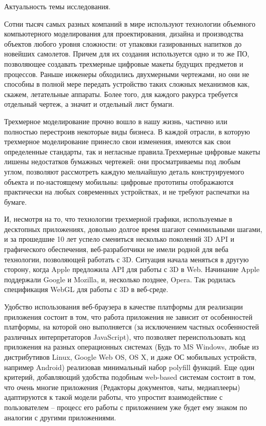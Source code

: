 \label{sec:intro}

Актуальность темы исследования. 

Сотни тысяч самых разных компаний в мире используют технологии объемного компьютерного моделирования для проектирования, дизайна и производства объектов любого уровня сложности: от упаковки 
газированных напитков до новейших самолетов. Причем для их создания используется одно и то же ПО, позволяющее создавать трехмерные цифровые макеты будущих предметов и процессов. 
Раньше инженеры обходились двухмерными чертежами, но они не способны в полной мере передать устройство таких сложных механизмов как, скажем, летательные аппараты. Более того, для 
каждого ракурса требуется отдельный чертеж, а значит и отдельный лист бумаги.

Трехмерное моделирование прочно вошло в нашу жизнь, частично или полностью перестроив некоторые виды бизнеса. В каждой отрасли, в которую трехмерное моделирование принесло свои изменения, имеются как свои
определенные стандарты, так и негласные правила.Трехмерные цифровые макеты лишены недостатков бумажных чертежей: они просматриваемы под любым углом, позволяют рассмотреть каждую мельчайшую деталь конструируемого объекта и по-настоящему 
мобильны: цифровые прототипы отображаются практически на любых современных устройствах, и не требуют распечатки на бумаге. 

И, несмотря на то, что технологии трехмерной графики, используемые в десктопных приложениях, довольно долгое время шагают семимильными шагами, и за прошедшие 10 лет успело смениться 
несколько поколений 3D API и графического обеспечения, веб-разработчики не имели родной для веба технологии, позволяющей работать с 3D.
Ситуация начала меняться в другую сторону, когда Apple предложила API для работы с 3D в Web. Начинание Apple поддержали Google и Mozilla, и, несколько позднее, Opera. Так родилась 
спецификация WebGL для работы с 3D в веб-среде.

Удобство использования веб-браузера в качестве платформы для реализации приложения состоит в том, что работа приложения не зависит от особенностей платформы, на которой оно выполняется 
(за исключением частных особенностей различных интерпретаторов JavaScript), что позволяет переиспользовать код приложения на разных операционных системах (Будь то MS Windows, любые из 
дистрибутивов Linux, Google Web OS, OS X, и даже ОС мобильных устройств, например Android) реализовав минимальный набор polyfill функций. Еще один критерий, добавляющий удобства подобным 
web-based системам состоит в том, что очень многие приложения (Редакторы документов, чаты, медиаплееры) адаптируются к такой модели работы, что упростит взаимодействие с пользователем --
процесс его работы с приложением уже будет ему знаком по аналогии с другими приложениями.\cite{3D_in_web}
 
